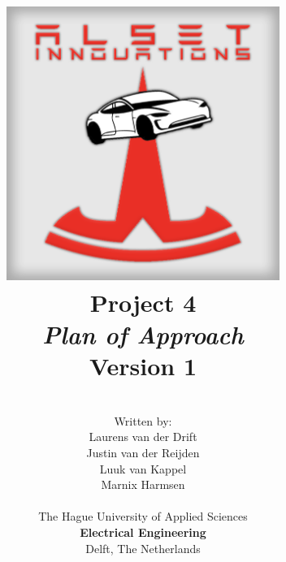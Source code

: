 \title{
\includegraphics[width=3.5in]{img/Logo/Logo.png} \\
\vspace*{1in}
\textbf{Project 4}\\
\textit{Plan of Approach}\\
Version 1
}
\author{
\vspace*{0.5in} \\
  Written by:\\
  Laurens van der Drift\\
  Justin van der Reijden\\
  Luuk van Kappel\\
  Marnix Harmsen\\
		\vspace*{0.2in} \\
		The Hague University of Applied Sciences\\
        \textbf{Electrical Engineering}\\
        Delft, The Netherlands
       } 